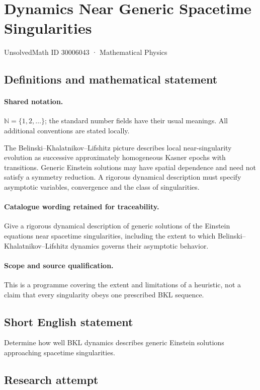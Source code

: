 \documentclass[11pt]{article}
\begin{document}
\setcounter{section}{30006042}
\section{Dynamics Near Generic Spacetime Singularities}\label{30006043}
{\small UnsolvedMath ID 30006043 · Mathematical Physics}
\subsection{Definitions and mathematical statement}

\paragraph{Shared notation.}$\mathbb N=\{1,2,\ldots\}$; the standard number fields have their usual meanings. All additional conventions are stated locally.


The Belinski--Khalatnikov--Lifshitz picture describes local near-singularity evolution as successive approximately homogeneous Kasner epochs with transitions. Generic Einstein solutions may have spatial dependence and need not satisfy a symmetry reduction. A rigorous dynamical description must specify asymptotic variables, convergence and the class of singularities.

\paragraph{Catalogue wording retained for traceability.}
Give a rigorous dynamical description of generic solutions of the Einstein equations near spacetime singularities, including the extent to which Belinski–Khalatnikov–Lifshitz dynamics governs their asymptotic behavior.

\paragraph{Scope and source qualification.}This is a programme covering the extent and limitations of a heuristic, not a claim that every singularity obeys one prescribed BKL sequence.
\subsection{Short English statement}
Determine how well BKL dynamics describes generic Einstein solutions approaching spacetime singularities.
\subsection{Research attempt}
\end{document}

